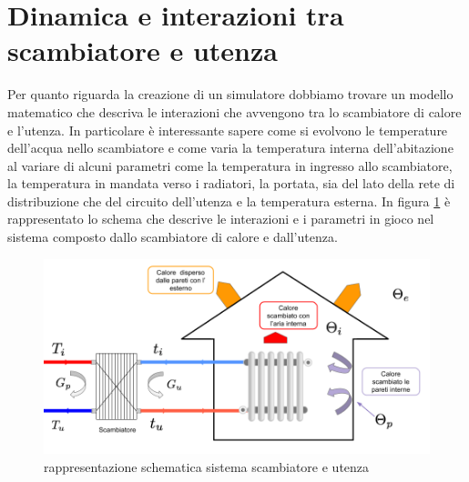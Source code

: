 \documentclass[laurea,oneside,11pt]{USiena_tesiLM}
\begin{document}
\section{Dinamica e interazioni tra scambiatore e utenza}
Per quanto riguarda la creazione di un simulatore dobbiamo trovare un modello matematico che descriva le interazioni che avvengono tra lo scambiatore di calore e l'utenza. In particolare è interessante sapere come si evolvono le temperature dell'acqua nello scambiatore e come varia la temperatura interna dell'abitazione al variare di alcuni parametri come la temperatura in ingresso allo scambiatore, la temperatura in mandata verso i radiatori, la portata, sia del lato della rete di distribuzione che del circuito dell'utenza e la temperatura esterna.
In figura \ref{fig:scamb_utenza} è rappresentato lo schema che descrive le interazioni e i parametri in gioco nel sistema composto dallo scambiatore di calore e dall'utenza. 

\begin{figure}[h]
\begin{center}
\includegraphics[width=\textwidth]{figure/scamb_utenza} %
\caption{rappresentazione schematica sistema scambiatore e utenza}
\label{fig:scamb_utenza}
\end{center}
\end{figure}
\end{document}
